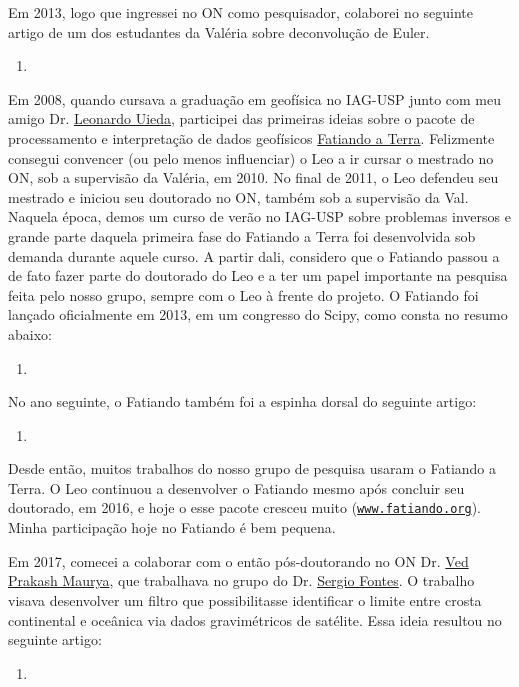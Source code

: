 Em 2013, logo que ingressei no ON como pesquisador, colaborei no seguinte artigo de um dos
estudantes da Valéria sobre deconvolução de Euler.
\begin{enumerate}
	\item {}
\end{enumerate}

\bigskip

\noindent Em 2008, quando cursava a graduação em geofísica no IAG-USP junto com meu amigo
Dr. \href{https://www.leouieda.com/}{Leonardo Uieda}, participei das primeiras ideias 
sobre o pacote de processamento e interpretação de dados geofísicos 
\href{https://www.fatiando.org/about/}{\textsf{Fatiando a Terra}}. 
Felizmente consegui convencer (ou pelo menos influenciar) o Leo a ir cursar o mestrado
no ON, sob a supervisão da Valéria, em 2010. 
No final de 2011, o Leo defendeu seu mestrado e iniciou seu doutorado no ON,
também sob a supervisão da Val.
Naquela época, demos um curso de verão no IAG-USP sobre problemas inversos e
grande parte daquela primeira fase do Fatiando a Terra foi desenvolvida sob demanda
durante aquele curso.
A partir dali, considero que o Fatiando passou a de fato fazer parte do doutorado 
do Leo e a ter um papel importante na pesquisa feita pelo nosso grupo, sempre com o Leo
à frente do projeto. O Fatiando foi lançado oficialmente em 2013, em um congresso
do Scipy, como consta no resumo abaixo:
\begin{enumerate}
	\item {}
\end{enumerate}
No ano seguinte, o Fatiando também foi a espinha dorsal do seguinte artigo:
\begin{enumerate}
	\item {}
\end{enumerate}
Desde então, muitos trabalhos do nosso grupo de pesquisa usaram o Fatiando a Terra.
O Leo continuou a desenvolver o Fatiando mesmo após concluir seu doutorado, em 2016,
e hoje o esse pacote cresceu muito 
(\href{https://www.fatiando.org/about/}{\texttt{www.fatiando.org}}).
Minha participação hoje no Fatiando é bem pequena.

\bigskip

\noindent Em 2017, comecei a colaborar com o então pós-doutorando no ON Dr.
\href{https://www.researchgate.net/profile/Ved-Maurya}{Ved Prakash Maurya},
que trabalhava no grupo do Dr. 
\href{https://lattes.cnpq.br/8537150955145617}{Sergio Fontes}.
O trabalho visava desenvolver um filtro que possibilitasse identificar o 
limite entre crosta continental e oceânica via dados gravimétricos de satélite.
Essa ideia resultou no seguinte artigo:
\begin{enumerate}
	\item {}
\end{enumerate}

